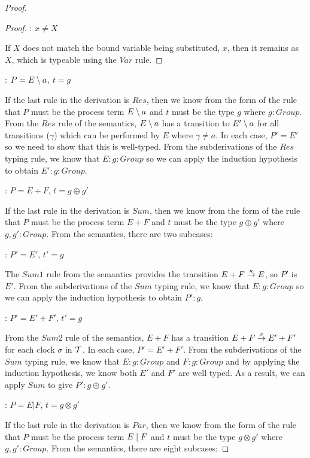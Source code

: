 \begin{proof}
\begin{proof}
: $x \ne X$

\noindent If $X$ does not match the bound variable being substituted, $x$, then it
remains as $X$, which is typeable using the $Var$ rule.

\end{proof}

: $P = E \setminus {a}$, $t = g$

\noindent If the last rule in the derivation is $Res$, then we know
from the form of the rule that $P$ must be the process term $E
\setminus {a}$ and $t$ must be the type $g$ where $g : Group$.  From the
$Res$ rule of the semantics, $E \setminus {a}$ has a transition to $E'
\setminus {a}$ for all transitions ($\gamma$) which can be performed by $E$
where $\gamma \ne a$.  In each case, $P' = E'$ so we need
to show that this is well-typed.  From the subderivations of the $Res$
typing rule, we know that $E : g : Group$ so we can apply the
induction hypothesis to obtain $E' : g : Group$.

: $P = E + F$, $t = g \oplus g'$

\noindent If the last rule in the derivation is $Sum$, then we know
from the form of the rule that $P$ must be the process term $E + F$
and $t$ must be the type $g \oplus g'$ where $g, g' : Group$.  From
the semantics, there are two subcases:

: $P' = E'$, $t' = g$

\noindent The $Sum1$ rule from the semantics provides the transition
$E + F \stackrel{\kappa}{\rightarrow} E$, so $P'$ is $E'$.  From the
subderivations of the $Sum$ typing rule, we know that $E : g : Group$
so we can apply the induction hypothesis to obtain $P' : g$.

: $P' = E' + F'$, $t' = g$

\noindent From the $Sum2$ rule of the semantics, $E + F$ has a
transition $E + F \stackrel{\sigma}{\rightarrow} E' + F'$ for each clock $\sigma$ in
$\text{$\mathcal{T}$}$.  In each case, $P' = E' + F'$.  From the subderivations of
the $Sum$ typing rule, we know that $E : g : Group$ and $F : g :
Group$ and by applying the induction hypothesis, we know both $E'$ and
$F'$ are well typed.  As a result, we can apply $Sum$ to give $P' : g
\oplus g'$.

: $P = E | F$, $t = g \otimes g'$

\noindent If the last rule in the derivation is $Par$, then we know
from the form of the rule that $P$ must be the process term $E \;|\; F$
and $t$ must be the type $g \otimes g'$ where $g, g' : Group$.  From
the semantics, there are eight subcases:


\end{proof}
